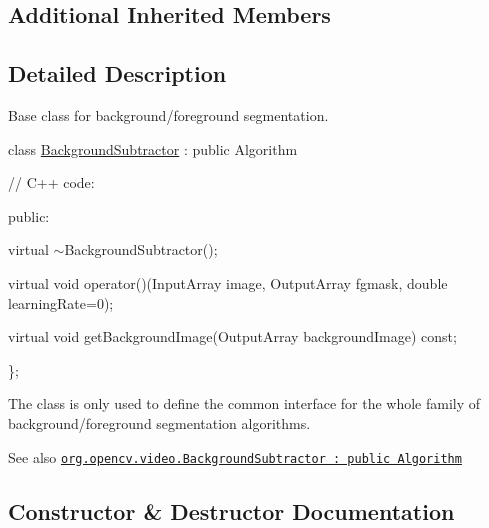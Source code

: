 \subsection*{Additional Inherited Members}


\subsection{Detailed Description}
Base class for background/foreground segmentation.

class \mbox{\hyperlink{classorg_1_1opencv_1_1video_1_1_background_subtractor}{Background\+Subtractor}} \+: public Algorithm {\ttfamily }

{\ttfamily }

{\ttfamily }

{\ttfamily // C++ code\+:}

{\ttfamily }

{\ttfamily }

{\ttfamily public\+:}

{\ttfamily }

{\ttfamily }

{\ttfamily virtual $\sim$\+Background\+Subtractor();}

{\ttfamily }

{\ttfamily }

{\ttfamily virtual void operator()(Input\+Array image, Output\+Array fgmask, double learning\+Rate=0);}

{\ttfamily }

{\ttfamily }

{\ttfamily virtual void get\+Background\+Image(\+Output\+Array background\+Image) const;}

{\ttfamily }

{\ttfamily }

{\ttfamily \};}

{\ttfamily }

{\ttfamily }

{\ttfamily The class is only used to define the common interface for the whole family of background/foreground segmentation algorithms. }

\begin{DoxySeeAlso}{See also}
\href{http://docs.opencv.org/modules/video/doc/motion_analysis_and_object_tracking.html#backgroundsubtractor}{\tt org.\+opencv.\+video.\+Background\+Subtractor \+: public Algorithm} 
\end{DoxySeeAlso}


\subsection{Constructor \& Destructor Documentation}
\mbox{\label{classorg_1_1opencv_1_1video_1_1_background_subtractor_a1d5f3d01bd917289c673cdfe056a8687}} 
